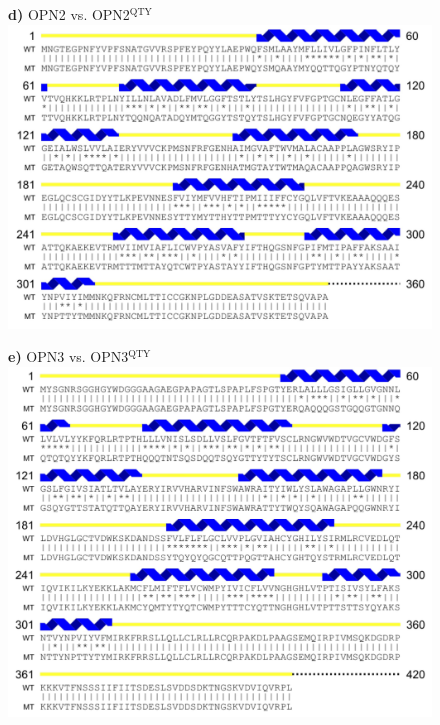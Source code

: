 \documentclass[fleqn,12pt]{supp}
\begin{document}
\newpage
\begin{figure}[H]
    \textbf{d)} OPN2 vs. OPN2$^{\textrm{QTY}}$ \\
    \includegraphics[width=\linewidth]{SuppFigures/opn2.jpg}
\end{figure}

\newpage
\begin{figure}[H]
    \textbf{e)} OPN3 vs. OPN3$^{\textrm{QTY}}$ \\
    \includegraphics[width=\linewidth]{SuppFigures/opn3.jpg}
\end{figure}
\end{document}
